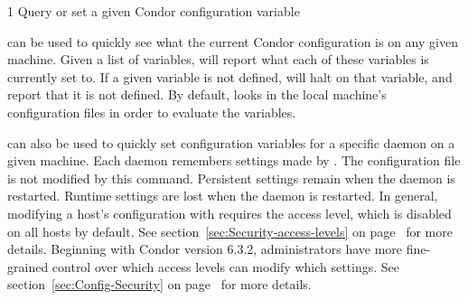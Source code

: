 \begin{ManPage}{\label{man-condor-config-val}}{1}
{Query or set a given Condor configuration variable}
\Synopsis {}











\Description

 can be used to quickly see what the current
Condor configuration is on any given machine.  Given a list of
variables,  will report what each of these
variables is currently set to.  If a given variable is not defined,
 will halt on that variable, and report that it is
not defined.  By default,  looks in the local
machine's configuration files in order to evaluate the variables.

 can also be used to quickly set configuration
variables for a specific daemon on a given machine.  Each daemon
remembers settings made by .  The configuration
file is not modified by this command.  Persistent settings remain when
the daemon is restarted.  Runtime settings are lost when the daemon is
restarted.  In general, modifying a host's configuration with
requires the  access level, which is disabled on all
hosts by default.  See section~\ref{sec:Security-access-levels} on
page~\pageref{sec:Security-access-levels} for more details.
Beginning with Condor version 6.3.2, administrators have more
fine-grained control over which access levels can modify which
settings.
See section~\ref{sec:Config-Security} on
page~\pageref{sec:Config-Security} for more details.


\end{ManPage}
